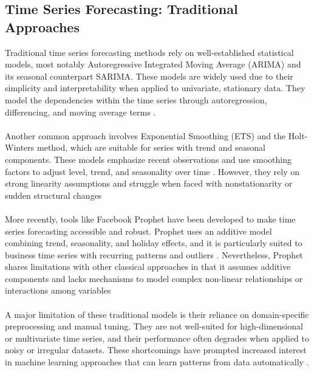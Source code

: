 \documentclass{article}
\begin{document}
\subsection{Time Series Forecasting: Traditional Approaches}
Traditional time series forecasting methods rely on well-established statistical models, most notably Autoregressive Integrated Moving Average (ARIMA) and its seasonal counterpart SARIMA. These models are widely used due to their simplicity and interpretability when applied to univariate, stationary data. They model the dependencies within the time series through autoregression, differencing, and moving average terms \cite{box1970time,hyndman2015forecasting}.\\
\\
Another common approach involves Exponential Smoothing (ETS) and the Holt-Winters method, which are suitable for series with trend and seasonal components. These models emphasize recent observations and use smoothing factors to adjust level, trend, and seasonality over time \cite{hyndman2015forecasting}. However, they rely on strong linearity assumptions and struggle when faced with nonstationarity or sudden structural changes\\
\\
More recently, tools like Facebook Prophet have been developed to make time series forecasting accessible and robust. Prophet uses an additive model combining trend, seasonality, and holiday effects, and it is particularly suited to business time series with recurring patterns and outliers \cite{taylor2018prophet}. Nevertheless, Prophet shares limitations with other classical approaches in that it assumes additive components and lacks mechanisms to model complex non-linear relationships or interactions among variables\\
\\
A major limitation of these traditional models is their reliance on domain-specific preprocessing and manual tuning. They are not well-suited for high-dimensional or multivariate time series, and their performance often degrades when applied to noisy or irregular datasets. These shortcomings have prompted increased interest in machine learning approaches that can learn patterns from data automatically \cite{kaloudi2023review}.
\end{document}
